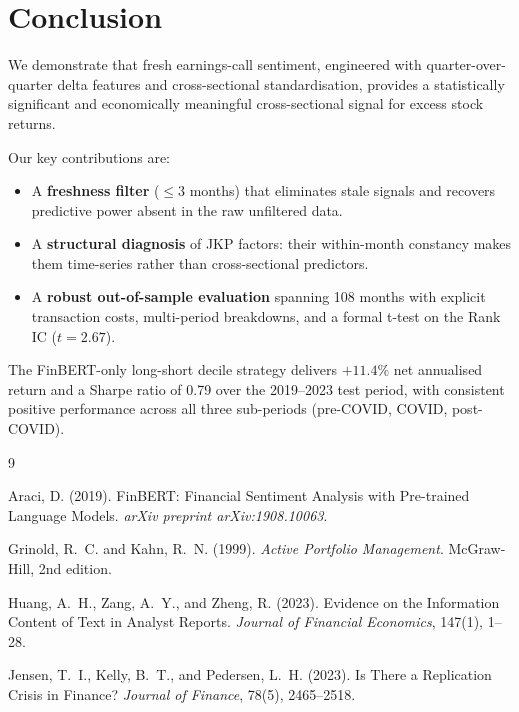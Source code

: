 \documentclass[11pt, a4paper]{article}
\begin{document}
\section{Conclusion}

We demonstrate that fresh earnings-call sentiment, engineered with
quarter-over-quarter delta features and cross-sectional standardisation,
provides a statistically significant and economically meaningful cross-sectional
signal for excess stock returns.

Our key contributions are:
\begin{itemize}[noitemsep]
    \item A \textbf{freshness filter} ($\leq 3$ months) that eliminates stale signals
          and recovers predictive power absent in the raw unfiltered data.
    \item A \textbf{structural diagnosis} of JKP factors: their within-month
          constancy makes them time-series rather than cross-sectional predictors.
    \item A \textbf{robust out-of-sample evaluation} spanning 108 months with
          explicit transaction costs, multi-period breakdowns, and a formal
          t-test on the Rank IC ($t = 2.67$).
\end{itemize}

The FinBERT-only long-short decile strategy delivers $+11.4\%$ net annualised
return and a Sharpe ratio of 0.79 over the 2019--2023 test period, with
consistent positive performance across all three sub-periods (pre-COVID,
COVID, post-COVID).


\begin{thebibliography}{9}

Araci, D. (2019).
\newblock FinBERT: Financial Sentiment Analysis with Pre-trained Language Models.
\newblock \textit{arXiv preprint arXiv:1908.10063}.

Grinold, R.~C. and Kahn, R.~N. (1999).
\newblock \textit{Active Portfolio Management}.
\newblock McGraw-Hill, 2nd edition.

Huang, A.~H., Zang, A.~Y., and Zheng, R. (2023).
\newblock Evidence on the Information Content of Text in Analyst Reports.
\newblock \textit{Journal of Financial Economics}, 147(1), 1--28.

Jensen, T.~I., Kelly, B.~T., and Pedersen, L.~H. (2023).
\newblock Is There a Replication Crisis in Finance?
\newblock \textit{Journal of Finance}, 78(5), 2465--2518.

\end{thebibliography}
\end{document}
